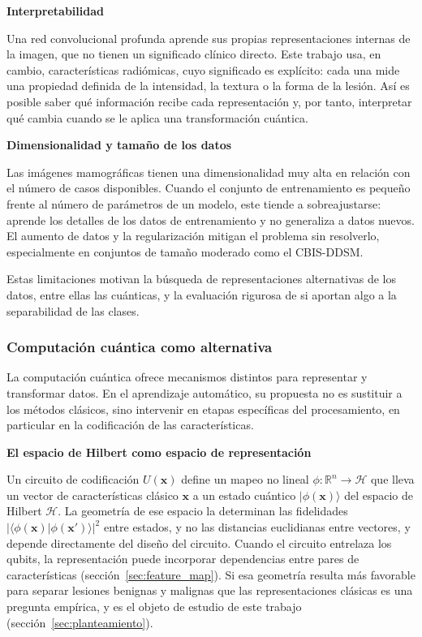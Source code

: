 \textbf{Interpretabilidad}

Una red convolucional profunda aprende sus propias representaciones internas de la imagen, que no
tienen un significado clínico directo. Este trabajo usa, en cambio, características radiómicas, cuyo
significado es explícito: cada una mide una propiedad definida de la intensidad, la textura o la
forma de la lesión. Así es posible saber qué información recibe cada representación y, por tanto,
interpretar qué cambia cuando se le aplica una transformación cuántica.

\textbf{Dimensionalidad y tamaño de los datos}

Las imágenes mamográficas tienen una dimensionalidad muy alta en relación con el número de casos
disponibles. Cuando el conjunto de entrenamiento es pequeño frente al número de parámetros de un
modelo, este tiende a sobreajustarse: aprende los detalles de los datos de entrenamiento y no
generaliza a datos nuevos. El aumento de datos y la regularización mitigan el problema sin
resolverlo, especialmente en conjuntos de tamaño moderado como el CBIS-DDSM.

Estas limitaciones motivan la búsqueda de representaciones alternativas de los datos, entre ellas
las cuánticas, y la evaluación rigurosa de si aportan algo a la separabilidad de las clases.

\subsubsection{Computación cuántica como alternativa}

La computación cuántica ofrece mecanismos distintos para representar y transformar datos. En el
aprendizaje automático, su propuesta no es sustituir a los métodos clásicos, sino intervenir en etapas
específicas del procesamiento, en particular en la codificación de las características.

\textbf{El espacio de Hilbert como espacio de representación}

Un circuito de codificación $U(\mathbf{x})$ define un mapeo no lineal
$\phi: \mathbb{R}^n \rightarrow \mathcal{H}$ que lleva un vector de características clásico
$\mathbf{x}$ a un estado cuántico $|\phi(\mathbf{x})\rangle$ del espacio de Hilbert $\mathcal{H}$. La
geometría de ese espacio la determinan las fidelidades
$|\langle\phi(\mathbf{x})|\phi(\mathbf{x}')\rangle|^2$ entre estados, y no las distancias euclidianas
entre vectores, y depende directamente del diseño del circuito. Cuando el circuito entrelaza los
qubits, la representación puede incorporar dependencias entre pares de características
(sección~\ref{sec:feature_map}). Si esa geometría resulta más favorable para separar lesiones
benignas y malignas que las representaciones clásicas es una pregunta empírica, y es el objeto de
estudio de este trabajo (sección~\ref{sec:planteamiento}).

